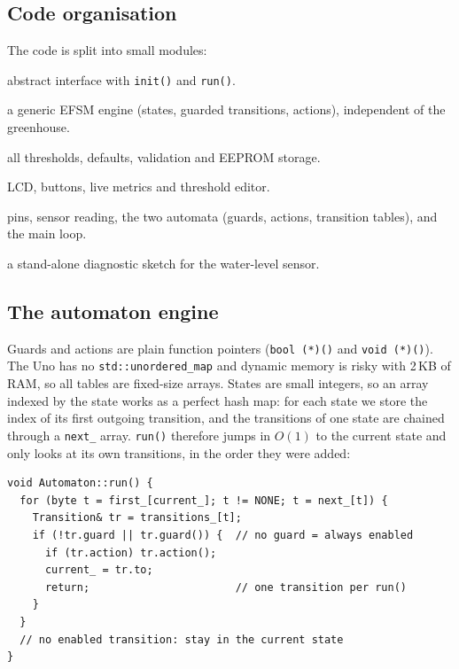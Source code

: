 \documentclass[10pt,a4paper,twocolumn]{article}
\newcommand{\code}[1]{\texttt{#1}}
\begin{document}
\subsection{Code organisation}
The code is split into small modules:
\begin{description}[leftmargin=0.6em,style=nextline,itemsep=0.2em]
  \item[\code{Model.h}] abstract interface with \code{init()} and \code{run()}.
  \item[\code{Automaton.h/.cpp}] a generic EFSM engine (states, guarded transitions,
        actions), independent of the greenhouse.
  \item[\code{Settings.h/.cpp}] all thresholds, defaults, validation and EEPROM storage.
  \item[\code{Menu.h/.cpp}] LCD, buttons, live metrics and threshold editor.
  \item[\code{GreenhouseSimple.ino}] pins, sensor reading, the two automata
        (guards, actions, transition tables), and the main loop.
  \item[\code{WaterLevelTest.ino}] a stand-alone diagnostic sketch for the
        water-level sensor.
\end{description}

\subsection{The automaton engine}
Guards and actions are plain function pointers (\code{bool (*)()} and
\code{void (*)()}). The Uno has no \code{std::unordered\_map} and dynamic memory is
risky with 2\,KB of RAM, so all tables are fixed-size arrays. States are small
integers, so an array indexed by the state works as a perfect hash map: for each state
we store the index of its first outgoing transition, and the transitions of one state
are chained through a \code{next\_} array. \code{run()} therefore jumps in $O(1)$ to the
current state and only looks at its own transitions, in the order they were added:

\begin{lstlisting}
void Automaton::run() {
  for (byte t = first_[current_]; t != NONE; t = next_[t]) {
    Transition& tr = transitions_[t];
    if (!tr.guard || tr.guard()) {  // no guard = always enabled
      if (tr.action) tr.action();
      current_ = tr.to;
      return;                       // one transition per run()
    }
  }
  // no enabled transition: stay in the current state
}
\end{lstlisting}
\end{document}
